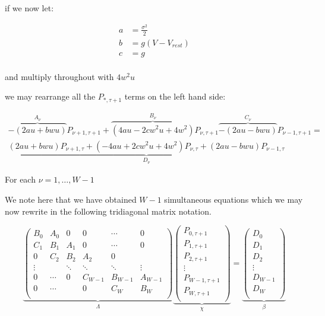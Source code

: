 \documentclass[10pt]{article}
\begin{document}
if we now let:

\begin{align*}
a &= \frac{\sigma^2}{2} \\
b &= g(V - V_{rest}) \\
c &= g \\
\end{align*}

and multiply throughout with $4w^2u$

we may rearrange all the $P_{*,\tau+1} $ terms on the left hand side:

\begin{multline}
    \overbrace{-(2au+bwu)}^{A_\nu} P_{\nu+1,\tau+1} + 
    \overbrace{(4au - 2cw^2u + 4w^2)}^{B_\nu} P_{\nu,\tau+1}
    \overbrace{-(2au-bwu)}^{C_\nu} P_{\nu-1,\tau+1}
    =  \\
    \underbrace{(2au+bwu) P_{\nu+1,\tau} +  
    (-4au +2cw^2u + 4w^2) P_{\nu,\tau} + 
    (2au-bwu) P_{\nu-1,\tau}}_{D_{\nu}}
\end{multline}

For each $ \nu = 1 , \dots , W-1 $

We note here that we have obtained $W-1$ simultaneous equations which
we may now rewrite in the following tridiagonal matrix notation.


\begin{equation}
\underbrace{
\begin{pmatrix}
    B_0    & A_0   & 0      & 0      & \cdots  & 0       \\
    C_1    & B_1   & A_1    & 0      & \cdots  & 0       \\
    0      & C_2   & B_2    & A_2    & 0      &         \\
    \vdots &       & \ddots & \ddots & \ddots & \vdots  \\
    0      & \cdots & 0      & C_{W-1}& B_{W-1}& A_{W-1} \\
    0      & \cdots &        & 0      & C_W    & B_W     \\
\end{pmatrix}}_{\Lambda}
\underbrace{
\begin{pmatrix}
    P_{0,\tau+1}   \\
    P_{1,\tau+1}   \\
    P_{2,\tau+1}   \\
    \vdots         \\
    P_{W-1,\tau+1} \\
    P_{W,\tau+1}   \\
\end{pmatrix}}_{\chi}
=
\underbrace{
\begin{pmatrix}
    D_0     \\
    D_1     \\
    D_2     \\
    \vdots  \\
    D_{W-1} \\
    D_W     \\
\end{pmatrix}}_{\beta}
\end{equation}
\end{document}
